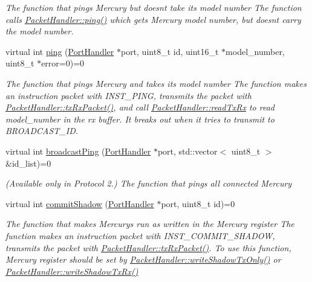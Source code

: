 \begin{DoxyCompactItemize}
\begin{DoxyCompactList}\small\item\em The function that pings Mercury but doesn\textquotesingle{}t take its model number  The function calls \hyperlink{classmercury_1_1_packet_handler_a5fce347ac1f55de301e50bac01c58f4f}{Packet\+Handler\+::ping()} which gets Mercury model number,  but doesn\textquotesingle{}t carry the model number. \end{DoxyCompactList}\item 
virtual int \hyperlink{classmercury_1_1_packet_handler_a10c18ef1d19f531f71c3996f10b6426d}{ping} (\hyperlink{classmercury_1_1_port_handler}{Port\+Handler} $\ast$port, uint8\+\_\+t id, uint16\+\_\+t $\ast$model\+\_\+number, uint8\+\_\+t $\ast$error=0)=0
\begin{DoxyCompactList}\small\item\em The function that pings Mercury and takes its model number  The function makes an instruction packet with I\+N\+S\+T\+\_\+\+P\+I\+NG,  transmits the packet with \hyperlink{classmercury_1_1_packet_handler_ac7ceeaec210827d119199144badaad3a}{Packet\+Handler\+::tx\+Rx\+Packet()},  and call \hyperlink{classmercury_1_1_packet_handler_ac743a57bba9e71aadb1578f0e704f166}{Packet\+Handler\+::read\+Tx\+Rx} to read model\+\_\+number in the rx buffer.  It breaks out  when it tries to transmit to B\+R\+O\+A\+D\+C\+A\+S\+T\+\_\+\+ID. \end{DoxyCompactList}\item 
virtual int \hyperlink{classmercury_1_1_packet_handler_aae8b5fb10e57973884589a0318e30fad}{broadcast\+Ping} (\hyperlink{classmercury_1_1_port_handler}{Port\+Handler} $\ast$port, std\+::vector$<$ uint8\+\_\+t $>$ \&id\+\_\+list)=0
\begin{DoxyCompactList}\small\item\em (Available only in Protocol 2.) The function that pings all connected Mercury \end{DoxyCompactList}\item 
virtual int \hyperlink{classmercury_1_1_packet_handler_a58972a466fed2dc14463a416af9c9887}{commit\+Shadow} (\hyperlink{classmercury_1_1_port_handler}{Port\+Handler} $\ast$port, uint8\+\_\+t id)=0
\begin{DoxyCompactList}\small\item\em The function that makes Mercurys run as written in the Mercury register  The function makes an instruction packet with I\+N\+S\+T\+\_\+\+C\+O\+M\+M\+I\+T\+\_\+\+S\+H\+A\+D\+OW,  transmits the packet with \hyperlink{classmercury_1_1_packet_handler_ac7ceeaec210827d119199144badaad3a}{Packet\+Handler\+::tx\+Rx\+Packet()}.  To use this function, Mercury register should be set by \hyperlink{classmercury_1_1_packet_handler_a1f0bf77b7d230076624b428664bbf678}{Packet\+Handler\+::write\+Shadow\+Tx\+Only()} or \hyperlink{classmercury_1_1_packet_handler_a5f81e12eabd4f661f828046ed0842727}{Packet\+Handler\+::write\+Shadow\+Tx\+Rx()} \end{DoxyCompactList}\item 

\end{DoxyCompactItemize}
